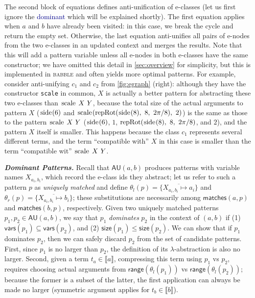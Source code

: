 \documentclass[acmsmall,screen,nonacm,review=false,timestamp=false]{acmart}
\newcommand{\emphbf}[1]{\emph{\textbf{#1}\xspace}}
\newcommand{\mypara}[1]{\smallskip\noindent\emphbf{#1.}\xspace}
\newcommand{\tname}[1]{\textsc{#1}\xspace}
\newcommand{\tool}{\tname{babble}}
\newcommand{\T}[1]{\mbox{\lstinline^#1^}}
\newcommand{\many}[1]{\overline{#1}}
\newcommand{\gau}{\mathsf{AU}}
\newcommand{\fv}{\mathsf{vars}}
\newcommand{\sz}{\mathsf{size}}
\newcommand{\rng}[1]{\mathsf{range}(#1)}
\newcommand{\matches}[2]{\mathsf{matches}(#1,#2)}
\newcommand{\denot}[1]{\llbracket #1 \rrbracket}
\begin{document}
The second block of equations defines anti-unification of e-classes
(let us first ignore the \textcolor{darkblue}{\sf dominant} which will be explained shortly).
The first equation applies when $a$ and $b$ have already been visited:
in this case, we break the cycle and return the empty set.
Otherwise, the last equation anti-unifies all pairs of e-nodes from the two e-classes
in an updated context and merges the results.
Note that this will add a pattern variable unless all e-nodes in both e-classes
have the same constructor;
we have omitted this detail in \autoref{sec:overview} for simplicity,
but this is implemented in \tool and often yields more optimal patterns.
For example, consider anti-unifying $c_1$ and $c_2$ from \autoref{fig:egraph} (right):
although they have the constructor \T{scale} in common,
$X$ is actually a better pattern for abstracting these two e-classes than $\T{scale}\  X\ Y$,
because the total size of the actual arguments to pattern $X$ ($\pSide{6}$ and $\scale{\repRot{\pSide{8}}{8}{2\pi/8}}{2}$)
is the same as those to the pattern $\T{scale}\  X\ Y$ ($\pSide{6}$, $1$, $\repRot{\pSide{8}}{8}{2\pi/8}$, and $2$),
and the pattern $X$ itself is smaller.
This happens because the class $c_1$ represents several different terms, 
and the term ``compatible with'' $X$ in this case is smaller than the term ``compatible wit'' $\T{scale}\  X\ Y$.



\mypara{Dominant Patterns}
Recall that $\gau(a,b)$ produces patterns
with variable names $X_{a_i,b_i}$, which record the e-class ids they abstract;
let us refer to such a pattern $p$ as \emph{uniquely matched}
and define $\theta_l(p) = \{\many{X_{a_i,b_i} \mapsto a_i}\}$ and $\theta_r(p) = \{\many{X_{a_i,b_i} \mapsto b_i}\}$;
these substitutions are necessarily among $\matches{a}{p}$ and $\matches{b}{p}$, respectively.
Given two uniquely matched patterns $p_1,p_2 \in \gau(a,b)$,
we say that $p_1$ \emph{dominates} $p_2$ in the context of $(a,b)$ if
  (1) $\fv(p_1) \subseteq \fv(p_2)$, and
  (2) $\sz(p_1) \leq \sz(p_2)$.
We can show that if $p_1$ dominates $p_2$,
then we can safely discard $p_2$ from the set of candidate patterns.
First, since $p_1$ is no larger than $p_2$, 
the definition of its $\lambda$-abstraction is also no larger.
Second, given a term $t_a\in \denot{a}$,
compressing this term using $p_1$ vs $p_2$,
requires choosing actual arguments from $\rng{\theta_l(p_1)}$ vs $\rng{\theta_l(p_2)}$;
because the former is a subset of the latter,
the first application can always be made no larger
(symmetric argument applies for $t_b\in \denot{b}$).
\end{document}
